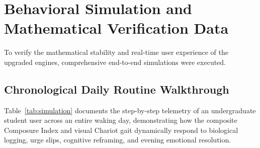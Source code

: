 \documentclass[11pt,a4paper]{article}
\begin{document}
\section{Behavioral Simulation and Mathematical Verification Data}

To verify the mathematical stability and real-time user experience of the upgraded engines, comprehensive end-to-end simulations were executed.

\subsection{Chronological Daily Routine Walkthrough}
Table~\ref{tab:simulation} documents the step-by-step telemetry of an undergraduate student user across an entire waking day, demonstrating how the composite Composure Index and visual Chariot gait dynamically respond to biological logging, urge slips, cognitive reframing, and evening emotional resolution.
\end{document}
